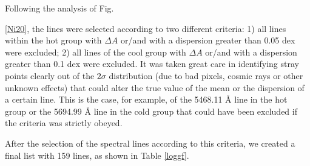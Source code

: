 \documentclass[dvips,12pt,a4paper]{report}
\begin{document}
{Following the analysis of Fig. {\ref{Ni20}, the lines were selected according to two different criteria: 1) all lines within the hot group with $\Delta A$ or/and with a dispersion greater than 0.05 dex were excluded; 2) all lines of the cool group with $\Delta A$ or/and  with a dispersion greater than 0.1 dex were excluded. It was taken great care in identifying stray points clearly out of the $2\sigma$ distribution (due to bad pixels, cosmic rays or other unknown effects) that could alter the true value of the mean or the dispersion of a certain line. This is the case, for example, of the 5468.11 \AA{} line in the hot group or the 5694.99 \AA{} line in the cold group that could have been excluded if the criteria was strictly obeyed. 

After the selection of the spectral lines according to this criteria, we created a final list with 159 lines, as shown in Table \ref{loggf}. 

}}
\end{document}
